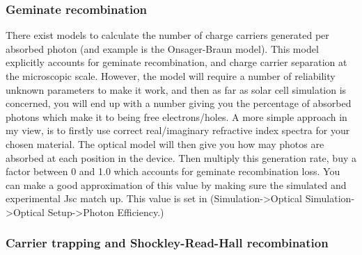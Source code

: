 \documentclass[11pt]{article}
\begin{document}
\subsubsection{Geminate recombination}
There exist models to calculate the number of charge carriers generated per absorbed photon (and example is the Onsager-Braun model).  This model explicitly accounts for geminate recombination, and charge carrier separation at the microscopic scale.  However, the model will require a number of reliability unknown parameters to make it work, and then as far as solar cell simulation is concerned, you will end up with a number giving you the percentage of absorbed photons which make it to being free electrons/holes.  A more simple approach in my view, is to firstly use correct real/imaginary refractive index spectra for your chosen material.  The optical model will then give you how may photos are absorbed at each position in the device.  Then multiply this generation rate, buy a factor between 0 and 1.0 which accounts for geminate recombination loss.  You can make a good approximation of this value by making sure the simulated and experimental Jsc match up.  This value is set in (Simulation->Optical Simulation->Optical Setup->Photon Efficiency.)


\subsubsection{Carrier trapping and Shockley-Read-Hall recombination}
\end{document}
